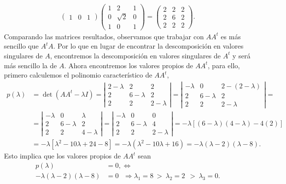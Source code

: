 \documentclass[11pt,letterpaper]{article}
\begin{document}
\begin{enumerate}
\begin{align*}
\begin{pmatrix}
1 & 0 & 1
\end{pmatrix}\begin{pmatrix}
1 & 2 & 1\\
0 & \sqrt{2} & 0\\
1 & 0 & 1
\end{pmatrix} = \begin{pmatrix}
2 & 2 & 2\\
2 & 6 & 2\\
2 & 2 & 2
\end{pmatrix}.
\end{align*}
Comparando las matrices resultados, observamos que trabajar con $AA^t$ es más sencillo que $A^tA$. Por lo que en lugar de encontrar la descomposición en valores singulares de $A$, encontremos la descomposición en valores singulares de $A^t$ y será más sencillo la de $A$.  
Ahora encontremos los valores propios de $AA^t$, para ello, primero calculemos el polinomio característico de $AA^t$,
\begin{align*}
p(\lambda) &= \det (AA^t-\lambda I)=
\left|\begin{array}{ccc}
2-\lambda & 2 & 2 \\
2& 6-\lambda & 2\\
2 & 2 & 2-\lambda
\end{array} \right|=
\left|\begin{array}{ccc}
-\lambda & 0 & 2-(2-\lambda) \\
2& 6-\lambda & 2\\
2 & 2 & 2-\lambda
\end{array} \right|=\\
&=\left|\begin{array}{ccc}
-\lambda & 0 & \lambda \\
2& 6-\lambda & 2\\
2 & 2 & 4-\lambda
\end{array} \right|=\left|\begin{array}{ccc}
-\lambda & 0 & 0 \\
2& 6-\lambda & 4\\
2 & 2 & 2-\lambda
\end{array} \right| = -\lambda[(6-\lambda)(4-\lambda)-4(2)]\\
&=-\lambda[\lambda^2-10\lambda+24-8]=-\lambda(\lambda^2-10\lambda+16)=-\lambda(\lambda-2)(\lambda-8).
\end{align*}
Esto implica que los valores propios de $AA^t$ sean
\begin{align*}
p(\lambda)&=0,\Leftrightarrow\\
-\lambda(\lambda-2)(\lambda-8)&=0\ \ \ \Rightarrow \lambda_1=8\ >\ \lambda_2=2 \ \ >  \ \lambda_3=0.

\end{align*}
\end{enumerate}
\end{document}
